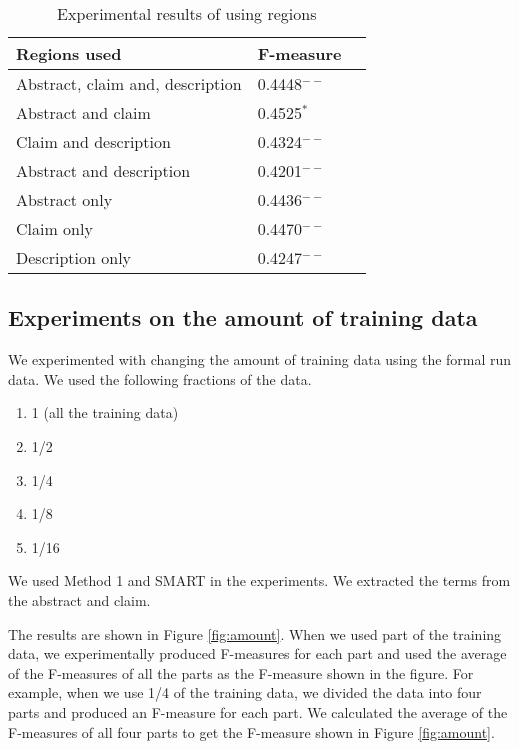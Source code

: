\documentclass[english]{jnlp_1.2c}
\begin{document}
\begin{table}[t]
\caption{Experimental results of using regions}
\label{tab:region}
\begin{center}
\begin{tabular}{|l|l|l|} \hline
Regions used                  & F-measure\\\hline 
Abstract, claim and, description   & 0.4448$^{--}$\\
Abstract and claim             & 0.4525$^{*}$\\
Claim and description          & 0.4324$^{--}$\\
Abstract and description       & 0.4201$^{--}$\\
Abstract only                  & 0.4436$^{--}$\\
Claim only                     & 0.4470$^{--}$\\
Description only               & 0.4247$^{--}$\\\hline
\end{tabular}
\end{center}
\end{table}

\subsection{Experiments on the amount of training data}

We experimented with changing the amount of training data
using the formal run data.
We used the following fractions of the data.
\begin{enumerate}
\item 
 1 (all the training data)

\item 
 1/2

\item 
 1/4

\item 
 1/8 
\item 
 1/16 
\end{enumerate}
We used Method 1 and SMART in the experiments. 
We extracted the terms from the abstract and claim.

The results are shown in Figure \ref{fig:amount}.
When we used part of the training data, 
we experimentally produced F-measures for each part 
and used the average of the F-measures of all the parts 
as the F-measure shown in the figure.
For example, when we use 1/4 of the training data, 
we divided the data into four parts
and produced an F-measure for each part. 
We calculated the average of the F-measures of all four parts 
to get the F-measure shown in Figure \ref{fig:amount}.
\end{document}
